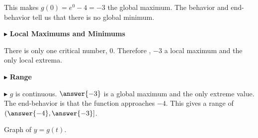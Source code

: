\documentclass{ximera}
\begin{document}
This makes $g(0) = e^0 - 4 = -3$ the global maximum.  The behavior and end-behavior tell us that there is no global minimum.







$\blacktriangleright$  \textbf{\textcolor{blue!55!black}{Local Maximums and Minimums}}


There is only one critical number, $0$.  Therefore , $-3$ a local maximum and the only local extrema.






$\blacktriangleright$  \textbf{\textcolor{blue!55!black}{Range}}


$\blacktriangleright$  $g$ is continuous.  $\answer{-3}$ is a global maximum and the only extreme value. The end-behavior is that the function approaches $-4$. This gives a range of $\left( \answer{-4}, \answer{-3} \right]$.










Graph of $y = g(t)$.
\end{document}
